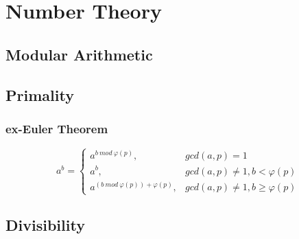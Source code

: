 \chapter{Number Theory}
\section{Modular Arithmetic}

\section{Primality}
\begin{compactmath}
\subsection{ex-Euler Theorem}
$$
a^b=
\left\{  
             \begin{array}{lr}  
             a^{b\ mod\ \varphi(p)},              & gcd(a,p) = 1\\ 
             a^b,                                 & gcd(a,p) \neq 1, b < \varphi(p)\\
             a^{(b\ mod\ \varphi(p))+\varphi(p)}, & gcd(a,p) \neq 1, b \ge \varphi(p)
             \end{array}  
\right.
$$
\end{compactmath}
\section{Divisibility}


